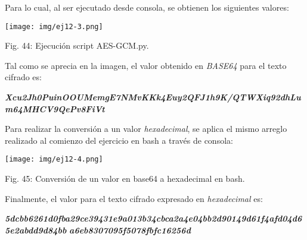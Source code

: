 \documentclass[12pt,oneside,a4paper]{book}
\begin{document}
\vspace{2em}

Para lo cual, al ser ejecutado desde consola, se obtienen los siguientes valores:

\vspace{2em}

\begin{center}
    \texttt{[image: img/ej12-3.png]}
    
\vspace{0.1em}
    
    Fig. 44: Ejecución script AES-GCM.py.
\end{center}

\vspace{2em}

\hspace{20pt}
Tal como se aprecia en la imagen, el valor obtenido en \textit{BASE64} para el texto cifrado es:

\vspace{1em}

\textbf{\textit{Xcu2Jh0PuinOOUMemgE7NMvKKk4Euy2QFJ1h9K/QTWXiq92dhLum64MHCV9QePv8FiVt}}

\vspace{1em}

\hspace{20pt}
Para realizar la conversión a un valor \textit{hexadecimal}, se aplica el mismo arreglo realizado al comienzo del ejercicio en bash a través de consola:

\vspace{2em}

\begin{center}
    \texttt{[image: img/ej12-4.png]}
    
\vspace{0.1em}
    
    Fig. 45: Conversión de un valor en base64 a hexadecimal en bash.
\end{center}

\vspace{2em}

Finalmente, el valor para el texto cifrado expresado en \textit{hexadecimal} es:

\vspace{1em}

\textbf{\textit{5dcbb6261d0fba29ce39431e9a013b34cbca2a4e04bb2d90149d61f4afd04d65e2abdd9d84bb}}
\newline
\textbf{\textit{a6eb8307095f5078fbfc16256d}}

\newpage
\end{document}
